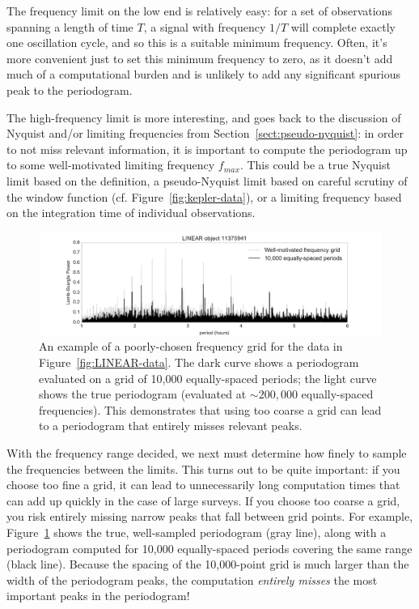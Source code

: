 \documentclass[preprint]{aastex}
\newcommand{\fig}[1]{Figure~\ref{fig:#1}}
\newcommand{\figlabel}[1]{\label{fig:#1}}
\newcommand{\Sect}[1]{Section~\ref{sect:#1}}
\newcommand{\sect}[1]{\Sect{#1}}
\begin{document}
The frequency limit on the low end is relatively easy: for a set of observations
spanning a length of time $T$,
a signal with frequency $1/T$ will complete exactly one oscillation cycle,
and so this is a suitable minimum frequency.
Often, it's more convenient just to set this minimum frequency to zero, as it
doesn't add much of a computational burden and is unlikely to add any
significant spurious peak to the periodogram.

The high-frequency limit is more interesting, and goes back to the discussion
of Nyquist and/or limiting frequencies from \sect{pseudo-nyquist}:
in order to not miss relevant information, it is important to compute the
periodogram up to some well-motivated limiting frequency $f_{max}$. This could
be a true Nyquist limit based on the \citep{Eyer99} definition, a pseudo-Nyquist
limit based on careful scrutiny of the window function (cf. \fig{kepler-data}),
or a limiting frequency based on the integration time of individual
observations.

\begin{figure}[ht]
  \centering
  \includegraphics[width=\textwidth]{fig19_LINEAR_coarse_grid}
  \caption{An example of a poorly-chosen frequency grid for the data in
    \fig{LINEAR-data}. The dark curve shows a periodogram evaluated on a
    grid of 10,000 equally-spaced periods; the light curve shows the true
    periodogram (evaluated at ${\sim}200,000$ equally-spaced frequencies).
    This demonstrates that using too coarse a grid can lead to a periodogram
    that entirely misses relevant peaks.
    \figlabel{LINEAR-coarse-grid}}
\end{figure}

With the frequency range decided, we next must determine how finely to sample
the frequencies between the limits.
This turns out to be quite important: if you choose too fine a grid, it can
lead to unnecessarily long computation times that can add up quickly in the
case of large surveys. If you choose too coarse a grid, you
risk entirely missing narrow peaks that fall between grid points.
For example, \fig{LINEAR-coarse-grid} shows the true, well-sampled periodogram
(gray line), along with a periodogram computed for 10,000 equally-spaced
periods covering the same range (black line).
Because the spacing of the 10,000-point grid is much larger than the width of
the periodogram peaks, the computation {\it entirely misses} the most
important peaks in the periodogram!
\end{document}
